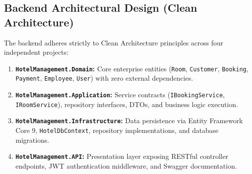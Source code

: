 \documentclass[11pt,a4paper]{article}
\begin{document}
\subsection{Backend Architectural Design (Clean Architecture)}
The backend adheres strictly to Clean Architecture principles across four independent projects:
\begin{enumerate}[leftmargin=*]
  \item \textbf{\texttt{HotelManagement.Domain}:} Core enterprise entities (\texttt{Room}, \texttt{Customer}, \texttt{Booking}, \texttt{Payment}, \texttt{Employee}, \texttt{User}) with zero external dependencies.
  \item \textbf{\texttt{HotelManagement.Application}:} Service contracts (\texttt{IBookingService}, \texttt{IRoomService}), repository interfaces, DTOs, and business logic execution.
  \item \textbf{\texttt{HotelManagement.Infrastructure}:} Data persistence via Entity Framework Core 9, \texttt{HotelDbContext}, repository implementations, and database migrations.
  \item \textbf{\texttt{HotelManagement.API}:} Presentation layer exposing RESTful controller endpoints, JWT authentication middleware, and Swagger documentation.
\end{enumerate}
\end{document}
